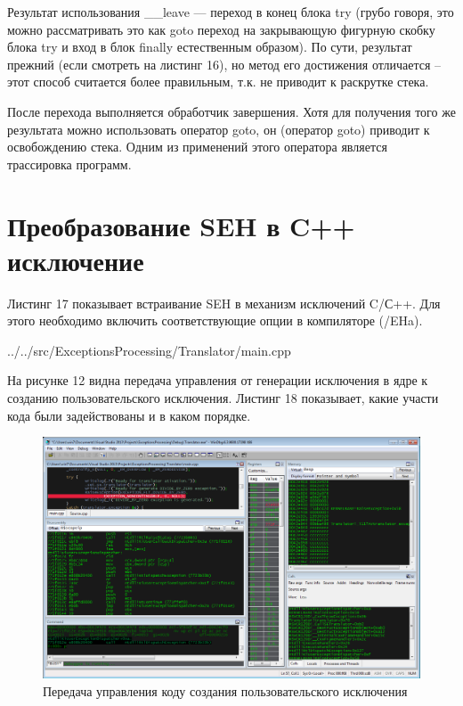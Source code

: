 \documentclass[a4paper, 12pt]{report}		%
\begin{document}
Результат использования \_\_leave — переход в конец блока try (грубо говоря, это можно рассматривать это как goto переход на закрывающую фигурную скобку блока try и вход в блок finally естественным образом). По сути, результат прежний (если смотреть на листинг 16), но метод его достижения отличается -- этот способ считается более правильным, т.к. не приводит к раскрутке стека.

После перехода выполняется обработчик завершения. Хотя для получения того же результата можно использовать оператор goto, он (оператор goto) приводит к освобождению стека. Одним из применений этого оператора является трассировка программ.


\chapter*{Преобразование SEH в C++ исключение}

Листинг 17 показывает встраивание SEH в механизм исключений C/С++. Для этого необходимо включить соответствующие опции в компиляторе (/EHa).


{../../src/ExceptionsProcessing/Translator/main.cpp}

На рисунке 12 видна передача управления от генерации исключения в ядре к созданию пользовательского исключения. Листинг 18 показывает, какие участи кода были задействованы и в каком порядке.

\begin{figure}[h!]
\centering
\includegraphics[scale=0.50]{res/012}
\caption{Передача управления коду создания пользовательского исключения}
\end{figure}
\end{document}
